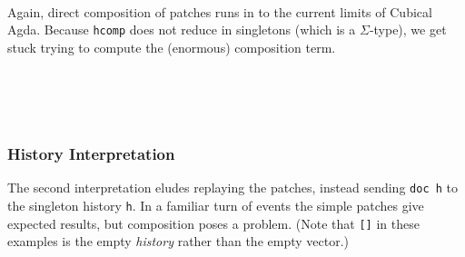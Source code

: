 \begin{code}
%
\>[2]\AgdaSymbol{\AgdaUnderscore{}}\AgdaSpace{}%
\AgdaSymbol{=}%
\>[507I]\AgdaSpace{}%
\AgdaSymbol{(}\AgdaSpace{}%
\AgdaSymbol{)}\AgdaSpace{}%
\AgdaSymbol{(}\AgdaSpace{}%
\AgdaSymbol{(}\AgdaSpace{}%
\AgdaSpace{}%
\AgdaInductiveConstructor{[]}\AgdaSpace{}%
\AgdaOperator{\AgdaInductiveConstructor{,}}\AgdaSpace{}%
\AgdaSymbol{))}\<%
\\
\>[.][@{}l@{}]\<[507I]%
\>[6]\AgdaSpace{}%
\AgdaSymbol{(}\AgdaSpace{}%
\AgdaSymbol{(}\AgdaInductiveConstructor{[]}\AgdaSpace{}%
\AgdaOperator{\AgdaInductiveConstructor{,}}\AgdaSpace{}%
\AgdaSymbol{))}\<%
\end{code}

Again, direct composition of patches runs in to the current limits of Cubical Agda.
Because \texttt{hcomp} does not reduce in singletons (which is a $\Sigma$-type),
we get stuck trying to compute the (enormous) composition term.
\begin{code}%
%
\>[2]\<%
\\
%
\>[2]\<%
\\
%
\>[2]\<%
\\
%
\>[2]\<%
\end{code}

\subsubsection{History Interpretation}

The second interpretation eludes replaying the patches, instead sending \texttt{doc h}
to the singleton history \texttt{h}. In a familiar turn of events the simple patches give
expected results, but composition poses a problem. (Note that \texttt{[]} in these examples
is the empty \emph{history} rather than the empty vector.)

